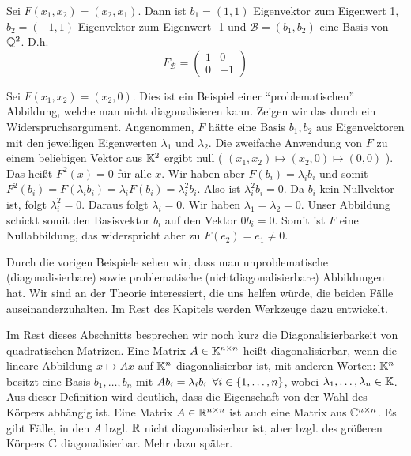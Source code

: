 \begin{bsp}[aus 6.1.1]
	Sei $ F(x_1,x_2) = (x_2,x_1) $. Dann ist $ b_1 = (1,1) $ Eigenvektor zum Eigenwert 1, $ b_2 = (-1,1) $ Eigenvektor zum Eigenwert -1 und $ \mathcal{B} = (b_1, b_2) $ eine Basis von $ \mathbb Q^2 $. D.h.
	\begin{equation*}
		F_\mathcal{B} = \begin{pmatrix}
			1 & 0 \\
			0 & -1
		\end{pmatrix}
	\end{equation*}
\end{bsp}
\begin{bsp}[aus 6.1.1]
	Sei $ F(x_1,x_2) = (x_2,0) $. Dies ist ein Beispiel einer ``problematischen'' Abbildung, welche man nicht diagonalisieren kann. Zeigen wir das durch ein Widerspruchsargument. Angenommen, $F$ hätte eine Basis $b_1,b_2$ aus Eigenvektoren mit den jeweiligen Eigenwerten $\lambda_1$ und $\lambda_2$. Die zweifache Anwendung von $F$ zu einem beliebigen Vektor aus $\mathbb K^2$ ergibt null ( $(x_1,x_2) \mapsto (x_2,0) \mapsto (0,0)$ ). Das heißt $F^2(x) =0$ für alle $x$. Wir haben aber $F(b_i) = \lambda_i b_i$ und somit $F^2(b_i) = F(\lambda_i b_i) = \lambda_i F(b_i) = \lambda_i^2 b_i$. Also ist $\lambda_i^2 b_i = 0$. Da $b_i$ kein Nullvektor ist, folgt $\lambda_i^2 = 0$. Daraus folgt $\lambda_i =0$. Wir haben $\lambda_1 = \lambda_2 = 0$. Unser Abbildung schickt somit den Basisvektor $b_i$ auf den Vektor $0 b_i =0$. Somit ist $F$ eine Nullabbildung, das widerspricht aber zu $F(e_2) = e_1 \ne 0$.
\end{bsp}

Durch die vorigen Beispiele sehen wir, dass man unproblematische (diagonalisierbare) sowie problematische (nichtdiagonalisierbare) Abbildungen hat. Wir sind an der Theorie interessiert, die uns helfen würde, die beiden Fälle auseinanderzuhalten. Im Rest des Kapitels werden Werkzeuge dazu entwickelt. 

Im Rest dieses Abschnitts besprechen wir noch  kurz die Diagonalisierbarkeit von quadratischen Matrizen. Eine Matrix $ A \in \mathbb K^{n \times n} $ heißt diagonalisierbar, wenn die lineare Abbildung $ x \mapsto Ax $ auf $ \mathbb K^n $ diagonalisierbar ist, 
mit anderen Worten: $ \mathbb K^n $ besitzt eine Basis $ b_1, \ldots, b_n $ mit $ Ab_i = \lambda_ib_i \enspace\forall i \in \{ 1,\ldots,n \} $, wobei $ \lambda_1, \ldots, \lambda_n \in \mathbb K $. Aus dieser Definition wird deutlich, dass die Eigenschaft von der Wahl des Körpers abhängig ist. Eine Matrix $A \in \mathbb R^{n \times n}$ ist auch eine Matrix aus $\mathbb C^{n \times n}$. Es gibt Fälle, in den $A$ bzgl. $\mathbb R$ nicht diagonalisierbar ist, aber bzgl. des größeren Körpers $\mathbb C$ diagonalisierbar. Mehr dazu später. 


